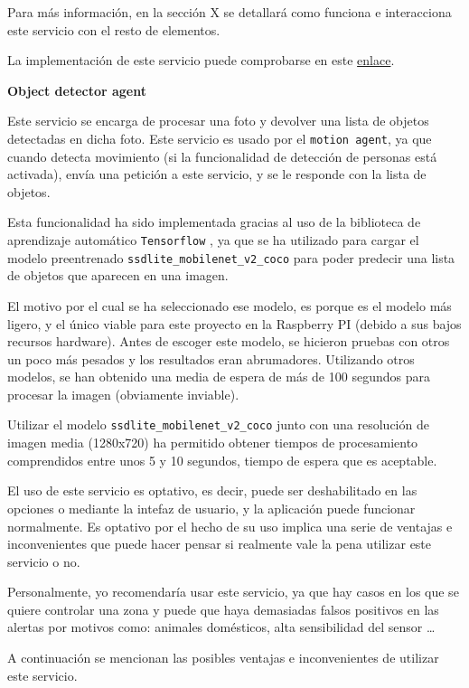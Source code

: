 Para más información, en la sección X se detallará como funciona e interacciona este servicio con el resto de elementos.

La implementación de este servicio puede comprobarse en este \href{https://github.com/jmv74211/TFM_security_system_PI/blob/master/src/agents/motion_agent.py}{enlace}.

\textbf{Object detector agent}

Este servicio se encarga de procesar una foto y devolver una lista de objetos detectadas en dicha foto. Este servicio es usado por el \texttt{motion agent}, ya que cuando detecta movimiento (si la funcionalidad de detección de personas está activada), envía una petición a este servicio, y se le responde con la lista de objetos.

Esta funcionalidad ha sido implementada gracias al uso de la biblioteca de aprendizaje automático \texttt{Tensorflow} \cite{ref17}, ya que se ha utilizado para cargar el modelo preentrenado \texttt{ssdlite\_mobilenet\_v2\_coco} \cite{ref27} para poder predecir una lista de objetos que aparecen en una imagen.

El motivo por el cual se ha seleccionado ese modelo, es porque es el modelo más ligero, y el único viable para este proyecto en la Raspberry PI (debido a sus bajos recursos hardware). Antes de escoger este modelo, se hicieron pruebas con otros un poco más pesados y los resultados eran abrumadores. Utilizando otros modelos, se han obtenido una media de espera de más de 100 segundos para procesar la imagen (obviamente inviable).

Utilizar el modelo \texttt{ssdlite\_mobilenet\_v2\_coco} junto con una resolución de imagen media (1280x720) ha permitido obtener tiempos de procesamiento comprendidos entre unos 5 y 10 segundos, tiempo de espera que es aceptable.

El uso de este servicio es optativo, es decir, puede ser deshabilitado en las opciones o mediante la intefaz de usuario, y la aplicación puede funcionar normalmente. Es optativo por el hecho de su uso implica una serie de ventajas e inconvenientes que puede hacer pensar si realmente vale la pena utilizar este servicio o no.

Personalmente, yo recomendaría usar este servicio, ya que hay casos en los que se quiere controlar una zona y puede que haya demasiadas falsos positivos en las alertas por motivos como: animales domésticos, alta sensibilidad del sensor \ldots

A continuación se mencionan las posibles ventajas e inconvenientes de utilizar este servicio.


